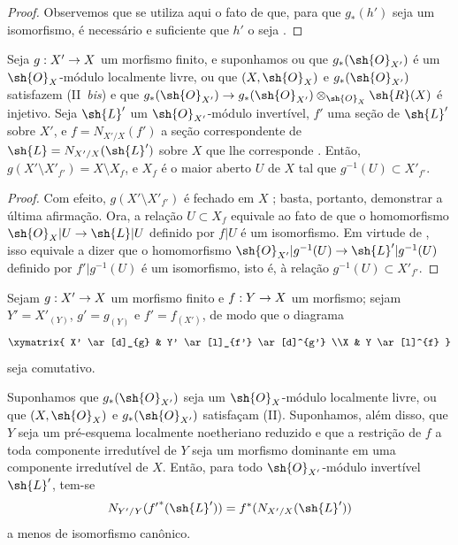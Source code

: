 \documentclass[oneside,10pt]{amsart}
\makeatletter
\newcommand{\ega@arrow}[2]{\mathchoice{#1}{#2}{#2}{#2}}
\renewcommand{\to}{\ega@arrow{\longrightarrow}{\rightarrow}}
\newcommand{\oldpage}[2][]{\marginnote{\normalfont\footnotesize\textbf{#1}~|~#2}\ignorespaces}
\let\EGAOriginalLabel\label
\renewcommand{\label}[1]{\phantomsection\EGAOriginalLabel{#1}}
\makeatother
\begin{document}
\begin{proof}
Observemos que se utiliza aqui o fato de que, para que $g_*(h')$ seja um isomorfismo, é necessário e suficiente que $h'$ o seja .
\end{proof}

\begin{corollary}[6.5.7]
\label{II.6.5.7}
Seja $g:X'\to X$ um morfismo finito, e suponhamos ou que $g_*(\sh{O}_{X'})$ é um $\sh{O}_X$-módulo localmente livre, ou que $(X,\sh{O}_X)$ e $g_*(\sh{O}_{X'})$ satisfazem (II~\emph{bis}) e que $g_*(\sh{O}_{X'})\to g_*(\sh{O}_{X'})\otimes_{\sh{O}_X}\sh{R}(X)$ é injetivo.
Seja $\sh{L}'$ um $\sh{O}_{X'}$-módulo invertível, $f'$ uma seção de $\sh{L}'$ sobre $X'$, e $f=N_{X'/X}(f')$ a seção correspondente de $\sh{L}=N_{X'/X}(\sh{L}')$ sobre $X$ que
\oldpage[II]{130}
lhe corresponde .
Então, $g(X'\setminus X'_{f'})=X\setminus X_f$, e $X_f$ é o maior aberto $U$ de $X$ tal que $g^{-1}(U)\subset X'_{f'}$.
\end{corollary}

\begin{proof}
Com efeito, $g(X'\setminus X'_{f'})$ é fechado em $X$ ;
basta, portanto, demonstrar a última afirmação.
Ora, a relação $U\subset X_f$ equivale ao fato de que o homomorfismo $\sh{O}_X|U\to\sh{L}|U$ definido por $f|U$ é um isomorfismo.
Em virtude de , isso equivale a dizer que o homomorfismo $\sh{O}_{X'}|g^{-1}(U)\to\sh{L}'|g^{-1}(U)$ definido por $f'|g^{-1}(U)$ é um isomorfismo, isto é, à relação $g^{-1}(U)\subset X'_{f'}$.
\end{proof}

\begin{proposition}[6.5.8]
\label{II.6.5.8}
Sejam $g:X'\to X$ um morfismo finito e $f:Y\to X$ um morfismo;
sejam $Y'=X'_{(Y)}$, $g'=g_{(Y)}$ e $f'=f_{(X')}$, de modo que o diagrama
\[
  \xymatrix{
    X' \ar[d]_{g}
    & Y' \ar[l]_{f'} \ar[d]^{g'}
  \\X
    & Y \ar[l]^{f}
  }
\]
seja comutativo.

Suponhamos que $g_*(\sh{O}_{X'})$ seja um $\sh{O}_X$-módulo localmente livre, ou que $(X,\sh{O}_X)$ e $g_*(\sh{O}_{X'})$ satisfaçam (II).
Suponhamos, além disso, que $Y$ seja um pré-esquema localmente noetheriano reduzido e que a restrição de $f$ a toda componente irredutível de $Y$ seja um morfismo dominante em uma componente irredutível de $X$.
Então, para todo $\sh{O}_{X'}$-módulo invertível $\sh{L}'$, tem-se
\[
  N_{Y'/Y}({f'}^*(\sh{L}')) = f^*(N_{X'/X}(\sh{L}'))
\]
a menos de isomorfismo canônico.
\end{proposition}
\end{document}
